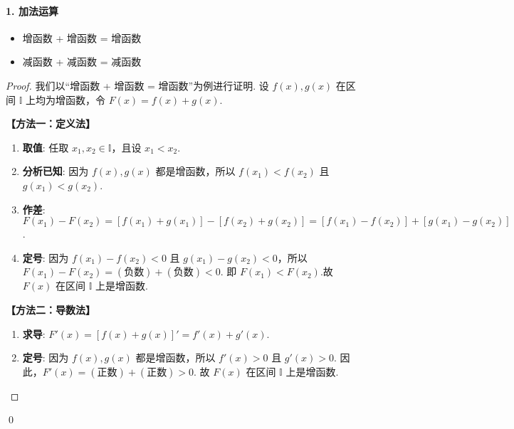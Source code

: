 \paragraph{1. 加法运算}
\begin{theorem}[加法律]
	\begin{itemize}
		\item 增函数 + 增函数 = 增函数
		\item 减函数 + 减函数 = 减函数
	\end{itemize}
\end{theorem}
\begin{proof}
	我们以“增函数 + 增函数 = 增函数”为例进行证明.
	设 $f(x), g(x)$ 在区间 $\mathbb{I}$ 上均为增函数，令 $F(x) = f(x) + g(x)$.
	
	\textbf{【方法一：定义法】}
	\begin{enumerate}
		\item \textbf{取值}: 任取 $x_1, x_2 \in \mathbb{I}$，且设 $x_1 < x_2$.
		\item \textbf{分析已知}: 因为 $f(x), g(x)$ 都是增函数，所以 $f(x_1) < f(x_2)$ 且 $g(x_1) < g(x_2)$.
		\item \textbf{作差}: $F(x_1) - F(x_2) = [f(x_1)+g(x_1)] - [f(x_2)+g(x_2)] = [f(x_1)-f(x_2)] + [g(x_1)-g(x_2)]$.
		\item \textbf{定号}: 因为 $f(x_1)-f(x_2) < 0$ 且 $g(x_1)-g(x_2) < 0$，所以
		$F(x_1)-F(x_2) = (\text{负数}) + (\text{负数}) < 0$.
		即 $F(x_1) < F(x_2)$.故 $F(x)$ 在区间 $\mathbb{I}$ 上是增函数.
	\end{enumerate}
	
	\textbf{【方法二：导数法】}
	\begin{enumerate}
		\item \textbf{求导}: $F'(x) = [f(x)+g(x)]' = f'(x)+g'(x)$.
		\item \textbf{定号}: 因为 $f(x), g(x)$ 都是增函数，所以 $f'(x)>0$ 且 $g'(x)>0$.
		因此，$F'(x) = (\text{正数}) + (\text{正数}) > 0$.
		故 $F(x)$ 在区间 $\mathbb{I}$ 上是增函数.
	\end{enumerate}
\end{proof}
\qed

